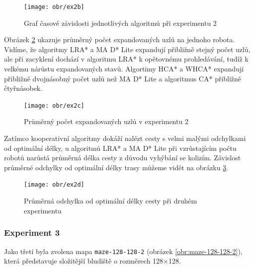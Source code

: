 \vspace*{-10mm}
\begin{figure}[H]
	\begin{center}
		\texttt{[image: obr/ex2b]}
	\end{center}
	\vspace*{-10mm}
	\caption[caption]{Graf časové závislosti jednotlivých algoritmů při experimentu 2}
	\label{obr:ex2b}
\end{figure}

Obrázek \ref{obr:ex2c} ukazuje průměrný počet expandovaných uzlů na jednoho robota. Vidíme, že algoritmy LRA* a MA D* Lite expandují přibližně stejný počet uzlů, ale při zacyklení dochází v algoritmu LRA* k opětovnému prohledávání, tudíž k velkému nárůstu expandovaných stavů. Algortimy HCA* a WHCA* expandují přibližně dvojnásobný počet uzlů než MA D* Lite a algoritmus CA* přibližně čtyřnásobek.

\vspace*{-10mm}
\begin{figure}[H]
	\begin{center}
		\texttt{[image: obr/ex2c]}
	\end{center}
	\vspace*{-10mm}
	\caption[caption]{Průměrný počet expandovaných uzlů v experimentu 2}
	\label{obr:ex2c}
\end{figure}

Zatímco kooperativní algoritmy dokáží nalézt cesty s velmi malými odchylkami od optimální délky, u algoritmů LRA* a MA D* Lite při vzrůstajícím počtu robotů narůstá průměrná délka cesty z důvodu vyhýbání se kolizím. Závislost průměrné odchylky od optimální délky trasy můžeme vidět na obrázku \ref{obr:ex2d}.

\vspace*{-10mm}
\begin{figure}[H]
	\begin{center}
		\texttt{[image: obr/ex2d]}
	\end{center}
	\vspace*{-10mm}
	\caption[caption]{Průměrná odchylka od optimální délky cesty při druhém experimentu}
	\label{obr:ex2d}
\end{figure}

\subsubsection{Experiment 3}
Jako třetí byla zvolena mapa \texttt{maze-128-128-2} (obrázek \ref{obr:maze-128-128-2}), která představuje složitější bludiště o rozměrech 128×128.

